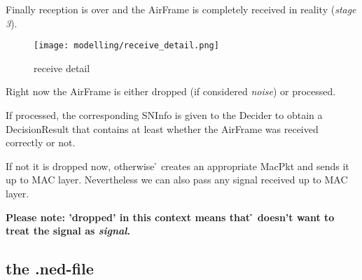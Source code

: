 Finally reception is over and the AirFrame is completely received in reality (\textit{stage 3}).

\begin{figure}[H]
 \centering
 \texttt{[image: modelling/receive\_detail.png]}
 \caption{receive detail}
 \label{fig: receive detail}
\end{figure}

Right now the AirFrame is either dropped (if considered \textit{noise}) or processed.

If processed, the corresponding SNInfo is given to the Decider to obtain a DecisionResult that contains at least whether the AirFrame was received correctly or not.

If not it is dropped now, otherwise \h{\bp} creates an appropriate MacPkt and sends it up to MAC layer. Nevertheless we can also pass any signal received up to MAC layer.

\textbf{Please note: 'dropped' in this context means that \h{\bp} doesn't want to treat the signal as \textit{signal}.}










\subsection{the .ned-file}

